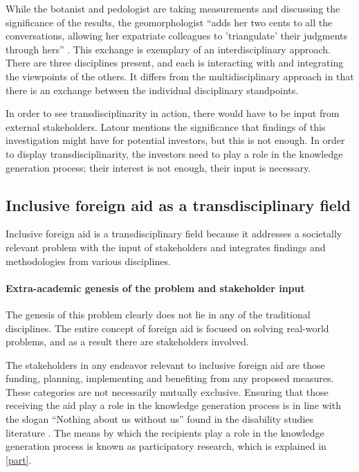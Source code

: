 \documentclass[a4paper]{article}
\begin{document}
While the botanist and pedologist are taking measurements and discussing the
significance of the results, the geomorphologist ``adds her two cents to all
the conversations, allowing her expatriate colleagues to 'triangulate' their
judgments through hers'' \citep{latour1999circulating}. This exchange is
exemplary of an interdisciplinary approach. There are three disciplines
present, and each is interacting with and integrating the viewpoints of the
others. It differs from the multidisciplinary approach in that there is an
exchange between the individual disciplinary standpoints.

In order to see transdisciplinarity in action, there would have to be input
from external stakeholders. Latour mentions the significance that findings of
this investigation might have for potential investors, but this is not enough.
In order to display transdisciplinarity, the investors need to play a role in
the knowledge generation process; their interest is not enough, their input is
necessary.

\subsection{Inclusive foreign aid as a transdisciplinary field}

Inclusive foreign aid is a transdisciplinary field because it addresses a
societally relevant problem with the input of stakeholders and integrates
findings and methodologies from various disciplines.

\paragraph{Extra-academic genesis of the problem and stakeholder input}

The genesis of this problem clearly does not lie in any of the traditional
disciplines. The entire concept of foreign aid is focused on solving
real-world problems, and as a result there are stakeholders involved.

The stakeholders in any endeavor relevant to inclusive foreign aid are those
funding, planning, implementing and benefiting from any proposed measures.
These categories are not necessarily mutually exclusive. Ensuring that those
receiving the aid play a role in the knowledge generation process is in line
with the slogan ``Nothing about us without us'' found in the disability
studies literature \citep{pfeiffer2000disability}. The means by which the
recipients play a role in the knowledge generation process is known as
participatory research, which is explained in \autoref{part}.
\end{document}
